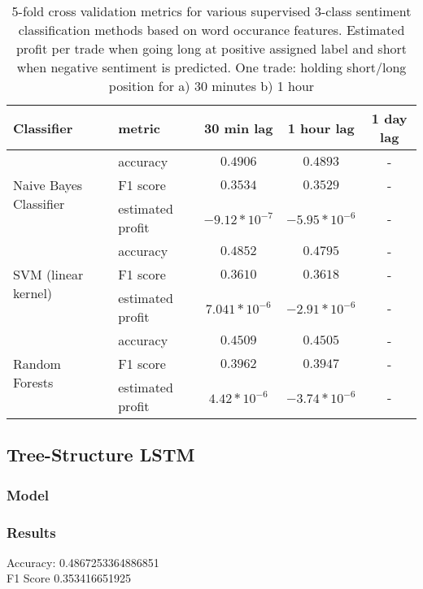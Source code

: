 \documentclass[a4paper,12pt]{article}%
\begin{document}
\begin{table}
\centering
\captionsetup{justification=centering}
\begin{tabular}{ |l|l|c|c|c| }
\hline
Classifier & metric & 30 min lag & 1 hour lag & 1 day lag \\ \hline
\multirow{3}{*}{Naive Bayes Classifier} & accuracy & $0.4906$ & $0.4893$ & - \\
 & F1 score & $0.3534$ & $0.3529$ & - \\
 & estimated profit & $-9.12 * 10^{-7}$ & $-5.95 * 10^{-6}$ & - \\ \hline
\multirow{3}{*}{SVM (linear kernel)} & accuracy & $0.4852$ & $0.4795$ & - \\
 & F1 score & $0.3610$ & $0.3618$ & - \\
 & estimated profit & $7.041 * 10^{-6}$ & $-2.91 * 10^{-6}$ & - \\ \hline
\multirow{3}{*}{Random Forests} & accuracy & $0.4509$ & $0.4505$ & - \\
 & F1 score & $0.3962$ & $0.3947$ & - \\
 & estimated profit & $4.42 * 10^{-6}$ & $-3.74 * 10^{-6}$ & - \\ \hline
\end{tabular}
\caption{5-fold cross validation metrics for various supervised 3-class sentiment classification methods based on word occurance features. Estimated profit per trade when going long at positive assigned label and short when negative sentiment is predicted. One trade: holding short/long position for a) 30 minutes b) 1 hour\label{table:bag-of-words-results}}
\end{table}

\subsection{Tree-Structure LSTM}
\subsubsection{Model}
\subsubsection{Results}
Accuracy:  0.4867253364886851 \\
F1 Score 0.353416651925
\end{document}

